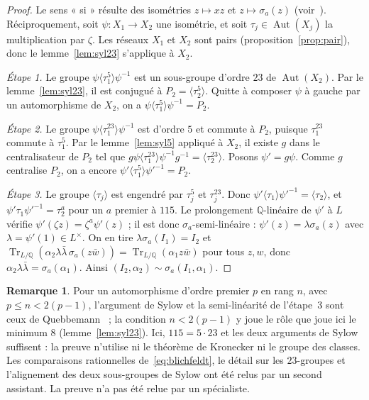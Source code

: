 \documentclass[11pt,a4paper]{amsart}
\theoremstyle{plain}
\theoremstyle{definition}
\newtheorem{remarque}[theoreme]{Remarque}
\numberwithin{equation}{section}
\newcommand{\Q}{\mathbb{Q}}
\DeclareMathOperator{\Tr}{Tr}
\DeclareMathOperator{\Aut}{Aut}
\begin{document}
\begin{proof}
Le sens « si » résulte des isométries $z\mapsto xz$ et $z\mapsto\sigma_a(z)$ (voir~\cite[\S5]{BFS05}). Réciproquement, soit $\psi\colon X_1\to X_2$ une isométrie, et soit $\tau_j\in\Aut(X_j)$ la multiplication par $\zeta$. Les réseaux $X_1$ et $X_2$ sont pairs (proposition~\ref{prop:pair}), donc le lemme~\ref{lem:syl23} s'applique à $X_2$.

\emph{Étape 1.} Le groupe $\psi\langle\tau_1^5\rangle\psi^{-1}$ est un sous-groupe d'ordre $23$ de $\Aut(X_2)$. Par le lemme~\ref{lem:syl23}, il est conjugué à $P_2=\langle\tau_2^5\rangle$. Quitte à composer $\psi$ à gauche par un automorphisme de $X_2$, on a $\psi\langle\tau_1^5\rangle\psi^{-1}=P_2$.

\emph{Étape 2.} Le groupe $\psi\langle\tau_1^{23}\rangle\psi^{-1}$ est d'ordre $5$ et commute à $P_2$, puisque $\tau_1^{23}$ commute à $\tau_1^5$. Par le lemme~\ref{lem:syl5} appliqué à $X_2$, il existe $g$ dans le centralisateur de $P_2$ tel que $g\psi\langle\tau_1^{23}\rangle\psi^{-1}g^{-1}=\langle\tau_2^{23}\rangle$. Posons $\psi'=g\psi$. Comme $g$ centralise $P_2$, on a encore $\psi'\langle\tau_1^5\rangle\psi'^{-1}=P_2$.

\emph{Étape 3.} Le groupe $\langle\tau_j\rangle$ est engendré par $\tau_j^5$ et $\tau_j^{23}$. Donc $\psi'\langle\tau_1\rangle\psi'^{-1}=\langle\tau_2\rangle$, et $\psi'\tau_1\psi'^{-1}=\tau_2^{a}$ pour un $a$ premier à $115$. Le prolongement $\Q$-linéaire de $\psi'$ à $L$ vérifie $\psi'(\zeta z)=\zeta^a\psi'(z)$ ; il est donc $\sigma_a$-semi-linéaire : $\psi'(z)=\lambda\sigma_a(z)$ avec $\lambda=\psi'(1)\in L^\times$. On en tire $\lambda\sigma_a(I_1)=I_2$ et $\Tr_{L/\Q}(\alpha_2\lambda\bar\lambda\,\sigma_a(z\bar w))=\Tr_{L/\Q}(\alpha_1z\bar w)$ pour tous $z,w$, donc $\alpha_2\lambda\bar\lambda=\sigma_a(\alpha_1)$. Ainsi $(I_2,\alpha_2)\sim\sigma_a(I_1,\alpha_1)$.
\end{proof}

\begin{remarque}
Pour un automorphisme d'ordre premier $p$ en rang $n$, avec $p\le n<2(p-1)$, l'argument de Sylow et la semi-linéarité de l'étape~3 sont ceux de Quebbemann~\cite[Satz~3.2\,b), p.~165]{Que81} ; la condition $n<2(p-1)$ y joue le rôle que joue ici le minimum $8$ (lemme~\ref{lem:syl23}). Ici, $115=5\cdot23$ et les deux arguments de Sylow suffisent : la preuve n'utilise ni le théorème de Kronecker ni le groupe des classes. Les comparaisons rationnelles de~\eqref{eq:blichfeldt}, le détail sur les $23$-groupes et l'alignement des deux sous-groupes de Sylow ont été relus par un second assistant. La preuve n'a pas été relue par un spécialiste.
\end{remarque}
\end{document}
